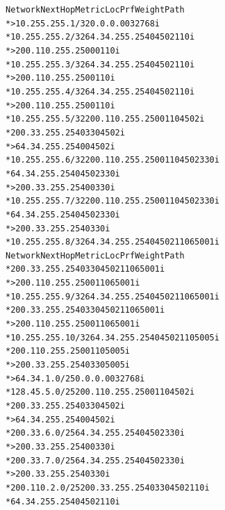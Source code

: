 \documentclass[12pt,twoside,a4paper]{report}
\begin{document}
{\begin{small}
\begin{alltt}
   Network          Next Hop            Metric LocPrf Weight Path
*> 10.255.255.1/32  0.0.0.0                  0         32768 i
*  10.255.255.2/32  64.34.255.254                          0 4502 110 i
*>                  200.110.255.250          0             0 110 i
*  10.255.255.3/32  64.34.255.254                          0 4502 110 i
*>                  200.110.255.250                        0 110 i
*  10.255.255.4/32  64.34.255.254                          0 4502 110 i
*>                  200.110.255.250                        0 110 i
*  10.255.255.5/32  200.110.255.250                        0 110 4502 i
*                   200.33.255.254                         0 330 4502 i
*>                  64.34.255.254            0             0 4502 i
*  10.255.255.6/32  200.110.255.250                        0 110 4502 330 i
*                   64.34.255.254                          0 4502 330 i
*>                  200.33.255.254           0             0 330 i
*  10.255.255.7/32  200.110.255.250                        0 110 4502 330 i
*                   64.34.255.254                          0 4502 330 i
*>                  200.33.255.254                         0 330 i
*  10.255.255.8/32  64.34.255.254                          0 4502 110 65001 i
   Network          Next Hop            Metric LocPrf Weight Path
*                   200.33.255.254                         0 330 4502 110 65001 i
*>                  200.110.255.250                        0 110 65001 i
*  10.255.255.9/32  64.34.255.254                          0 4502 110 65001 i
*                   200.33.255.254                         0 330 4502 110 65001 i
*>                  200.110.255.250                        0 110 65001 i
*  10.255.255.10/32 64.34.255.254                          0 4502 110 5005 i
*                   200.110.255.250                        0 110 5005 i
*>                  200.33.255.254                         0 330 5005 i
*> 64.34.1.0/25     0.0.0.0                  0         32768 i
*  128.45.5.0/25    200.110.255.250                        0 110 4502 i
*                   200.33.255.254                         0 330 4502 i
*>                  64.34.255.254            0             0 4502 i
*  200.33.6.0/25    64.34.255.254                          0 4502 330 i
*>                  200.33.255.254           0             0 330 i
*  200.33.7.0/25    64.34.255.254                          0 4502 330 i
*>                  200.33.255.254                         0 330 i
*  200.110.2.0/25   200.33.255.254                         0 330 4502 110 i
*                   64.34.255.254                          0 4502 110 i

\end{alltt}
\end{small}}
\end{document}
